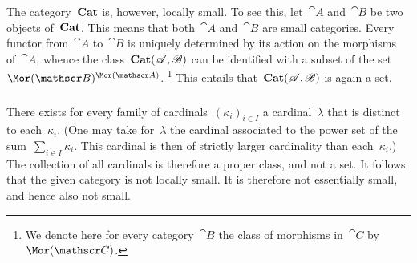 The category~$\mathbf{Cat}$ is, however, locally small.
To see this, let~$\cat{A}$ and~$\cat{B}$ be two objects of~$\mathbf{Cat}$.
This means that both~$\cat{A}$ and~$\cat{B}$ are small categories.
Every functor from~$\cat{A}$ to~$\cat{B}$ is uniquely determined by its action on the morphisms of~$\cat{A}$, whence the class~$\mathbf{Cat}(\mathscr{A}, \mathscr{B})$ can be identified with a subset of the set~$\Mor(\cat{B})^{\Mor(\cat{A})}$.%
\footnote{
	We denote here for every category~$\cat{B}$ the class of morphisms in~$\cat{C}$ by~$\Mor(\cat{C})$.
}
This entails that~$\mathbf{Cat}(\mathscr{A}, \mathscr{B})$ is again a set.



\subsubsection{}

There exists for every family of cardinals~$(κ_i)_{i ∈ I}$ a cardinal~$λ$ that is distinct to each~$κ_i$.
(One may take for~$λ$ the cardinal associated to the power set of the sum~$∑_{i ∈ I} κ_i$.
This cardinal is then of strictly larger cardinality than each~$κ_i$.)
The collection of all cardinals is therefore a proper class, and not a set.
It follows that the given category is not locally small.
It is therefore not essentially small, and hence also not small.
